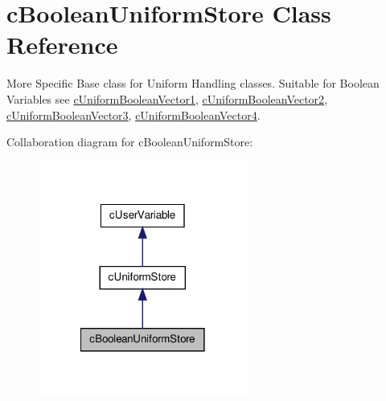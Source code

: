 \hypertarget{classc_boolean_uniform_store}{
\section{cBooleanUniformStore Class Reference}
\label{classc_boolean_uniform_store}
}


More Specific Base class for Uniform Handling classes. Suitable for Boolean Variables see \hyperlink{classc_uniform_boolean_vector1}{cUniformBooleanVector1}, \hyperlink{classc_uniform_boolean_vector2}{cUniformBooleanVector2}, \hyperlink{classc_uniform_boolean_vector3}{cUniformBooleanVector3}, \hyperlink{classc_uniform_boolean_vector4}{cUniformBooleanVector4}.  




Collaboration diagram for cBooleanUniformStore:\nopagebreak
\begin{figure}[H]
\begin{center}
\leavevmode
\includegraphics[width=194pt]{classc_boolean_uniform_store__coll__graph}
\end{center}
\end{figure}
